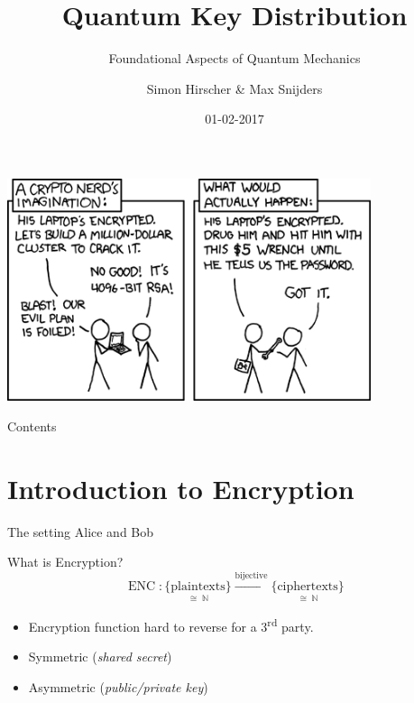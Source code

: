 \documentclass{beamer}
\title{Quantum Key Distribution}
\subtitle{Foundational Aspects of Quantum Mechanics}
\date{01-02-2017}
\author[Hirscher, Snijders]{Simon Hirscher \& Max Snijders}
\begin{document}

	\begin{frame}
	\end{frame}

	\begin{frame}
		\begin{center}
		\includegraphics[width=0.8\textwidth]{images/xkcd-security.png}
		\end{center}
	\end{frame}

	\begin{frame}
		\titlepage
	\end{frame}

	\begin{frame}{Contents} %
		\tableofcontents
	\end{frame}

	\section{Introduction to Encryption}
	\begin{frame}{The setting}
		Alice and Bob
	\end{frame}

	\begin{frame}{What is Encryption?} %
		\begin{equation}
			\operatorname{ENC}: \underset{\cong\;\mathbb{N}}{\{\text{plaintexts}\}}
						\overset{\text{bijective}}{\longrightarrow}
						\underset{\cong\;\mathbb{N}}{\{\text{ciphertexts}\}}
						\nonumber
		\end{equation}
		\begin{itemize}
			\item<2-> Encryption function hard to reverse for a 3\textsuperscript{rd} party.

 			\item<3-> Symmetric (\textit{shared secret})
 			\item<4-> Asymmetric (\textit{public/private key})
		\end{itemize}
	\end{frame}
\end{document}

